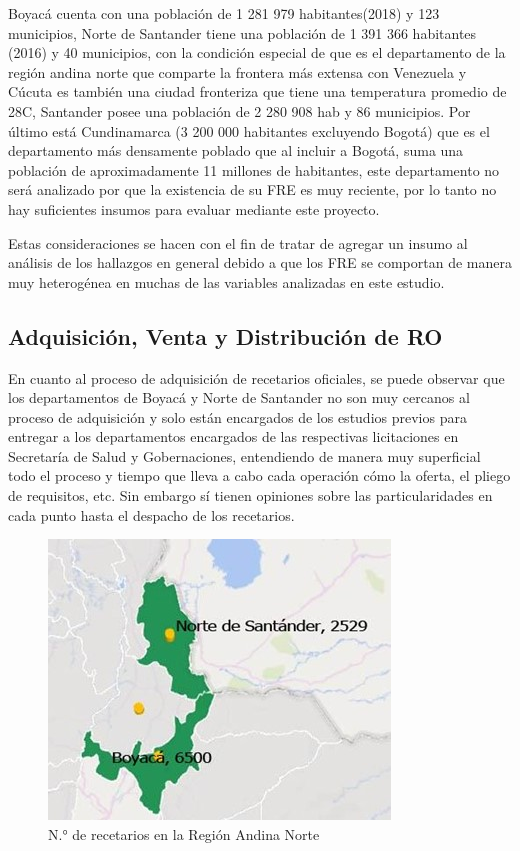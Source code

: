 \documentclass[
]{book}
\begin{document}
Boyacá cuenta con una población de 1 281 979 habitantes(2018) y 123 municipios, Norte de Santander tiene una población de 1 391 366 habitantes (2016) y 40 municipios, con la condición especial de que es el departamento de la región andina norte que comparte la frontera más extensa con Venezuela y Cúcuta es también una ciudad fronteriza que tiene una temperatura promedio de 28C, Santander posee una población de 2 280 908 hab y 86 municipios. Por último está Cundinamarca (3 200 000 habitantes excluyendo Bogotá) que es el departamento más densamente poblado que al incluir a Bogotá, suma una población de aproximadamente 11 millones de habitantes, este departamento no será analizado por que la existencia de su FRE es muy reciente, por lo tanto no hay suficientes insumos para evaluar mediante este proyecto.

Estas consideraciones se hacen con el fin de tratar de agregar un insumo al análisis de los hallazgos en general debido a que los FRE se comportan de manera muy heterogénea en muchas de las variables analizadas en este estudio.

\hypertarget{adquisiciuxf3n-venta-y-distribuciuxf3n-de-ro}{%
\subsection{Adquisición, Venta y Distribución de RO}\label{adquisiciuxf3n-venta-y-distribuciuxf3n-de-ro}}

En cuanto al proceso de adquisición de recetarios oficiales, se puede observar que los departamentos de Boyacá y Norte de Santander no son muy cercanos al proceso de adquisición y solo están encargados de los estudios previos para entregar a los departamentos encargados de las respectivas licitaciones en Secretaría de Salud y Gobernaciones, entendiendo de manera muy superficial todo el proceso y tiempo que lleva a cabo cada operación cómo la oferta, el pliego de requisitos, etc. Sin embargo sí tienen opiniones sobre las particularidades en cada punto hasta el despacho de los recetarios.

\begin{figure}
\includegraphics[width=0.85\linewidth]{figures/Imagen1} \caption{N.° de recetarios en la Región Andina Norte}\label{fig:NumeroRecRegAndinaNorte}
\end{figure}
\end{document}

